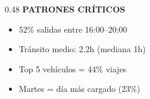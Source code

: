 \documentclass[aspectratio=169, 10pt]{beamer}
\begin{document}
\begin{frame}
\begin{columns}[T]
\begin{column}{0.48\textwidth}
\vspace{4pt}
{\scriptsize\color{gris}\textbf{PATRONES CR\'ITICOS}}
\begin{itemize}\setlength\itemsep{-2pt}\tiny
    \item[\textcolor{rojo}{\tiny$\blacksquare$}] 52\% salidas entre 16:00--20:00
    \item[\textcolor{rojo}{\tiny$\blacksquare$}] Tr\'ansito medio: 2.2h (mediana 1h)
    \item[\textcolor{rojo}{\tiny$\blacksquare$}] Top 5 veh\'iculos = 44\% viajes
    \item[\textcolor{rojo}{\tiny$\blacksquare$}] Martes = d\'ia m\'as cargado (23\%)
\end{itemize}
\end{column}
\end{columns}
\end{frame}
\end{document}
